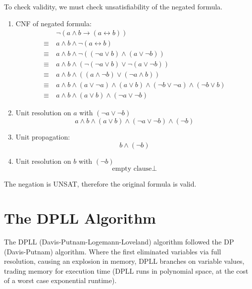 \documentclass[a4paper, 11pt]{report}
\begin{document}
To check validity, we must check unsatisfiability of the negated formula.
\begin{enumerate}
    \item CNF of negated formula:
    \begin{align*}
    & \neg(a \land b \to (a \leftrightarrow b)) \\
    \equiv\ & a \land b \land \neg(a \leftrightarrow b) \\
    \equiv\ & a \land b \land \neg((\neg a \lor b) \land (a \lor \neg b)) \\
    \equiv\ & a \land b \land (\neg(\neg a \lor b) \lor \neg(a \lor \neg b)) \\
    \equiv\ & a \land b \land ((a \land \neg b) \lor (\neg a \land b)) \\
    \equiv\ & a \land b \land (a \lor \neg a) \land (a \lor b) \land (\neg b \lor \neg a) \land (\neg b \lor b) \\
    \equiv\ & a \land b \land (a \lor b) \land (\neg a \lor \neg b)
    \end{align*}

    \item Unit resolution on $a$ with $(\neg a \lor \neg b)$ \\
    $$a \land b \land (a \lor b) \land (\neg a \lor \neg b) \land (\neg b)$$

    \item Unit propagation:
    $$b \land (\neg b)$$

    \item Unit resolution on $b$ with $(\neg b)$ \\
        $$\text{empty clause}\bot$$
\end{enumerate}
The negation is UNSAT, therefore the original formula is valid.

\section{The DPLL Algorithm}
The DPLL (Davis-Putnam-Logemann-Loveland) algorithm followed the DP (Davis-Putnam) algorithm. Where the first eliminated variables via full resolution, causing an explosion in memory, DPLL branches on variable values, trading memory for execution time (DPLL runs in polynomial space, at the cost of a worst case exponential runtime).
\end{document}
